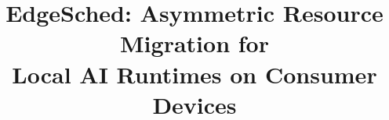 \documentclass[conference]{IEEEtran}
\begin{document}
\title{EdgeSched: Asymmetric Resource Migration for\\Local AI Runtimes on Consumer Devices}

\author{
}

\maketitle












\end{document}
